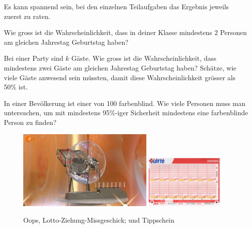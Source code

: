 \documentclass[%
11pt,%
twoside,%
titlepage,%
german,%
headsepline%
]{scrartcl}
\begin{document}
\begin{ueb}[Geburtstagsparadoxon]
Es
kann spannend sein, bei den einzelnen Teilaufgaben das Ergebnis jeweils zuerst zu raten.
\begin{enumeratea}
\item Wie gross ist die Wahrscheinlichkeit, dass in deiner Klasse mindestens $2$ Personen am gleichen Jahrestag Geburtstag haben?
\item Bei einer Party sind $k$ Gäste. Wie gross ist die Wahrscheinlichkeit, dass mindestens zwei Gäste am gleichen Jahrestag Geburtstag haben? Schätze, wie viele Gäste anwesend sein müssten, damit diese Wahrscheinlichkeit grösser als 50\% ist.
\end{enumeratea}
\end{ueb}

\begin{ueb}[farbenblind]
In einer Bevölkerung ist einer von 100 farbenblind. Wie viele Personen muss man untersuchen, um mit mindestens 95\%-iger Sicherheit mindestens eine farbenblinde Person zu finden?
\end{ueb}

\begin{figure}
  \begin{center}
    \includegraphics[width=0.6\textwidth]{pictures/lotto}
    \includegraphics[width=0.35\textwidth]{pictures/CHLotto}
  \end{center}
\caption{Oops, Lotto-Ziehung-Missgeschick; und Tippschein}
\end{figure}
\end{document}
